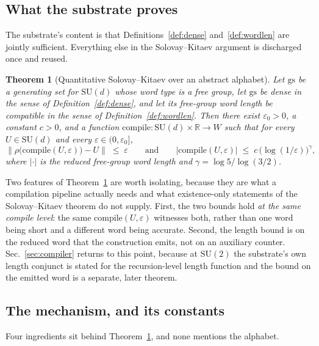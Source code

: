 \documentclass[aps,pra,reprint,nofootinbib,superscriptaddress]{revtex4-2}
\newcommand{\su}[1]{\mathrm{SU}(#1)}
\newcommand{\opn}[1]{\lVert #1 \rVert}
\theoremstyle{plain}
\newtheorem{theorem}{Theorem}
\theoremstyle{definition}
\begin{document}
\subsection{What the substrate proves}

The substrate's content is that Definitions~\ref{def:dense}
and~\ref{def:wordlen} are jointly sufficient. Everything else in the
Solovay--Kitaev argument is discharged once and reused.

\begin{theorem}[Quantitative Solovay--Kitaev over an abstract alphabet]
\label{thm:substrate}
Let $\mathrm{gs}$ be a generating set for $\su d$ whose word type is a free
group, let $\mathrm{gs}$ be dense in the sense of Definition~\ref{def:dense},
and let its free-group word length be compatible in the sense of
Definition~\ref{def:wordlen}. Then there exist $\varepsilon_0 > 0$, a constant
$c > 0$, and a function
$\mathrm{compile} \colon \su d \times \mathbb{R} \to W$
such that for every $U \in \su d$ and every $\varepsilon \in (0, \varepsilon_0]$,
\[
  \opn{\rho\big(\mathrm{compile}(U,\varepsilon)\big) - U} \;\le\; \varepsilon
  \qquad\text{and}\qquad
  \lvert \mathrm{compile}(U,\varepsilon)\rvert \;\le\;
    c\,\big(\log (1/\varepsilon)\big)^{\gamma},
\]
where $\lvert\cdot\rvert$ is the reduced free-group word length and
$\gamma = \log 5/\log(3/2)$.
\end{theorem}

Two features of Theorem~\ref{thm:substrate} are worth isolating, because they
are what a compilation pipeline actually needs and what existence-only
statements of the Solovay--Kitaev theorem do not supply. First, the two bounds
hold \emph{at the same compile level}: the same $\mathrm{compile}(U,\varepsilon)$
witnesses both, rather than one word being short and a different word being
accurate. Second, the length bound is on the reduced word that the construction
emits, not on an auxiliary counter. Sec.~\ref{sec:compiler} returns to this
point, because at $\su 2$ the substrate's own length conjunct is stated for the
recursion-level length function and the bound on the emitted word is a separate,
later theorem.

\subsection{The mechanism, and its constants}
\label{sec:substrate-mechanism}

Four ingredients sit behind Theorem~\ref{thm:substrate}, and none mentions the
alphabet.
\end{document}
